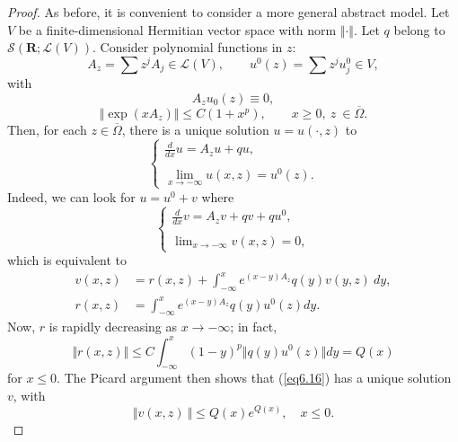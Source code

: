 \documentclass{surv-l}
\theoremstyle{plain}
\theoremstyle{definition}
\numberwithin{equation}{chapter}
\begin{document}
\begin{proof}
As before, it is convenient to consider a more general abstract model. Let $V$ be a finite-dimensional Hermitian vector space with norm $\Vert\cdot\Vert$. Let $q$ belong to $\mathscr{S}(\mathbf{R}; \mathscr{L}(V))$. Consider polynomial functions in $z$:
\begin{equation*}
A_{z}=\sum z^{j}A_{j}\in \mathscr{L}(V),\qquad u^{0}(z)=\sum z^{j}u_{j}^{0}\in V,
\end{equation*}
with
\setcounter{equation}{11}
\begin{equation}\label{eq6.12}
A_{z}u_{0}(z)\equiv 0,
\end{equation}
\begin{equation}\label{eq6.13}
\Vert\exp(xA_{z})\Vert\leq C(1+x^{p}),\qquad x\geq 0,\ z\ \in\overline{\Omega}.
\end{equation}
Then, for each $z\in\overline{\Omega}$, there is a unique solution $u=u(\cdot, z)$ to
\begin{equation}\label{eq6.14}
\left\{\begin{array}{ll}
\frac{d}{dx}u=A_{z}u+qu,\\
\\
\lim_{x\rightarrow-\infty}u(x, z) =u^{0}(z).
\end{array}\right.
\end{equation}
Indeed, we can look for $u=u^{0}+v$ where
\begin{equation}\label{eq6.15}
\left\{\begin{array}{ll}
\frac{d}{dx}v =A_{z}v+qv +qu^{0},\\
\\
\lim\nolimits_{x\rightarrow-\infty}v(x, z)=0,
\end{array}\right.
\end{equation}
which is equivalent to
\begin{align}\label{eq6.16}
v(x, z)&=r(x, z)+\int_{-\infty}^{x}e^{(x-y)A_{z}}q(y)v(y, z)\ dy,\\\nonumber
r(x, z)&=\int_{-\infty}^{x}e^{(x-y)A_{z}}q(y)u^{0}(z)dy.
\end{align}
Now, $r$ is rapidly decreasing as $x \rightarrow-\infty$; in fact,
\begin{equation*}
\Vert r(x, z)\Vert\leq C\int_{-\infty}^{x}(1-y)^{p}\Vert q(y)u^{0}(z)\Vert dy=Q(x)
\end{equation*}
for $x\leq 0$. The Picard argument then shows that (\ref{eq6.16}) has a unique solution $v$, with
\begin{equation}\label{eq6.17}
\Vert v(x,z)\ \Vert\leq Q(x)e^{Q(x)},\quad x\leq 0.
\end{equation}


\end{proof}
\end{document}
